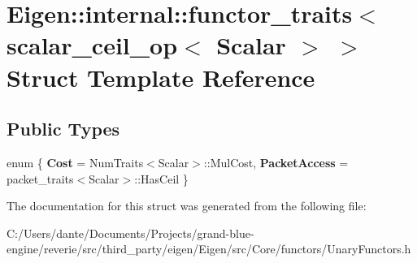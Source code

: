 \hypertarget{struct_eigen_1_1internal_1_1functor__traits_3_01scalar__ceil__op_3_01_scalar_01_4_01_4}{}\section{Eigen\+::internal\+::functor\+\_\+traits$<$ scalar\+\_\+ceil\+\_\+op$<$ Scalar $>$ $>$ Struct Template Reference}
\label{struct_eigen_1_1internal_1_1functor__traits_3_01scalar__ceil__op_3_01_scalar_01_4_01_4}
\subsection*{Public Types}
\begin{DoxyCompactItemize}
\item 
\mbox{\label{struct_eigen_1_1internal_1_1functor__traits_3_01scalar__ceil__op_3_01_scalar_01_4_01_4_ad5496b02110ce9c6d24c8a9fbb674794}} 
enum \{ {\bfseries Cost} = Num\+Traits$<$Scalar$>$\+::Mul\+Cost, 
{\bfseries Packet\+Access} = packet\+\_\+traits$<$Scalar$>$\+::Has\+Ceil
 \}
\end{DoxyCompactItemize}


The documentation for this struct was generated from the following file\+:\begin{DoxyCompactItemize}
\item 
C\+:/\+Users/dante/\+Documents/\+Projects/grand-\/blue-\/engine/reverie/src/third\+\_\+party/eigen/\+Eigen/src/\+Core/functors/Unary\+Functors.\+h\end{DoxyCompactItemize}
